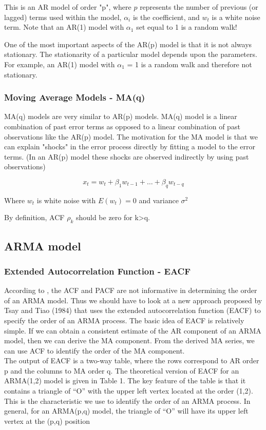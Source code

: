 This is an AR model of order "p", where $p$ represents the number of previous (or lagged) terms used within the model, $\alpha_i$ is the coefficient, and $w_t$ is a white noise term. Note that an AR(1) model with $\alpha_1$ set equal to 1 is a random walk!

One of the most important aspects of the AR(p) model is that it is not always stationary. The stationarity of a particular model depends upon the parameters. For example, an AR(1) model with $\alpha_1$ = 1 is a random walk and therefore not stationary.
\\
     	\subsubsection {Moving Average Models - MA(q)}
        
MA(q) models are very similar to AR(p) models. MA(q) model is a linear combination of past error terms as opposed to a linear combination of past observations like the AR(p) model. The motivation for the MA model is that we can explain "shocks" in the error process directly by fitting a model to the error terms. (In an AR(p) model these shocks are observed indirectly by using past observations) 

$$x_t=w_t+\beta_1w_{t-1}+…+\beta_qw_{t-q}$$ 

Where $w_t$ is white noise with $E(w_t)=0$ and variance $\sigma^2$

By definition, ACF $\rho_k$ should be zero for k>q.

\subsection {ARMA model}
		\subsubsection {Extended Autocorrelation Function - EACF}
        
According to \cite{tsa2012}, the ACF and PACF are not informative in determining the order of an ARMA model. Thus we should have to look at a new approach proposed by Tsay and Tiao (1984) that uses the extended autocorrelation function (EACF) to specify the order of an ARMA process. The basic idea of EACF is relatively simple. If we can obtain a consistent estimate of the AR component of an ARMA model, then we can derive the MA component. From the derived MA series, we can use ACF to identify the order of the MA component.
\\
The output of EACF is a two-way table, where the rows correspond to AR order p and the columns to MA order q. The theoretical version of EACF for an ARMA(1,2) model is given in Table 1. The key feature of the table is that it contains a triangle of “O” with the upper left vertex located at the order (1,2). This is the characteristic we use to identify the order of an ARMA process. In general, for an ARMA(p,q) model, the triangle of “O” will have its upper left vertex at the (p,q) position \\

